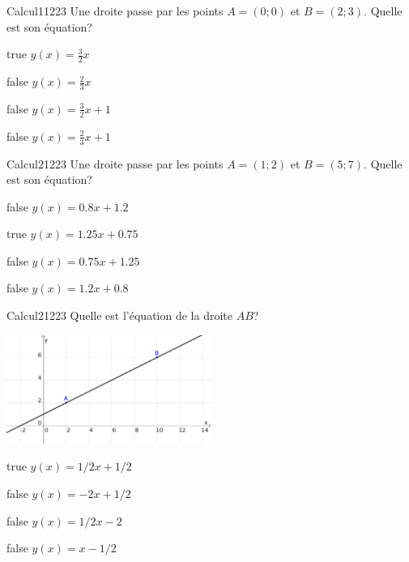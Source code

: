         	\begin{question}{27}{Calcul}{1}{1223}
				Une droite passe par les points $A = (0;0)$ et $B = (2;3)$. Quelle est son équation?
            \end{question}
            \begin{reponses}
            	\item[true] $y(x)=\frac{3}{2}x$
            	\item[false] $y(x)=\frac{2}{3}x$
                \item[false] $y(x)=\frac{3}{2}x+1$
                \item[false] $y(x)=\frac{2}{3}x+1$
            \end{reponses}
            \begin{question}{27}{Calcul}{2}{1223}
                Une droite passe par les points $A = (1;2)$ et $B = (5;7)$. Quelle est son équation?
            \end{question}
            \begin{reponses}
                \item[false] $y(x)=\num{0.8}x+\num{1.2}$
                \item[true] $y(x)=\num{1.25}x+\num{0.75}$
                \item[false] $y(x)=\num{0.75}x+\num{1.25}$
                \item[false] $y(x)=\num{1.2}x+\num{0.8}$
            \end{reponses}
            \begin{question}{27}{Calcul}{2}{1223}
                Quelle est l'équation de la droite $AB$?\\
                \begin{center}
                	\includegraphics[width=0.5\textwidth]{Philippe/Figures_Philippe/calcul_6_9.png}
                \end{center}
            \end{question}
            \begin{reponses}
                \item[true] $y(x)=1/2x+1/2$
                \item[false] $y(x)=-2x+1/2$
                \item[false] $y(x)=1/2x-2$
                \item[false] $y(x)=x-1/2$
            \end{reponses}
